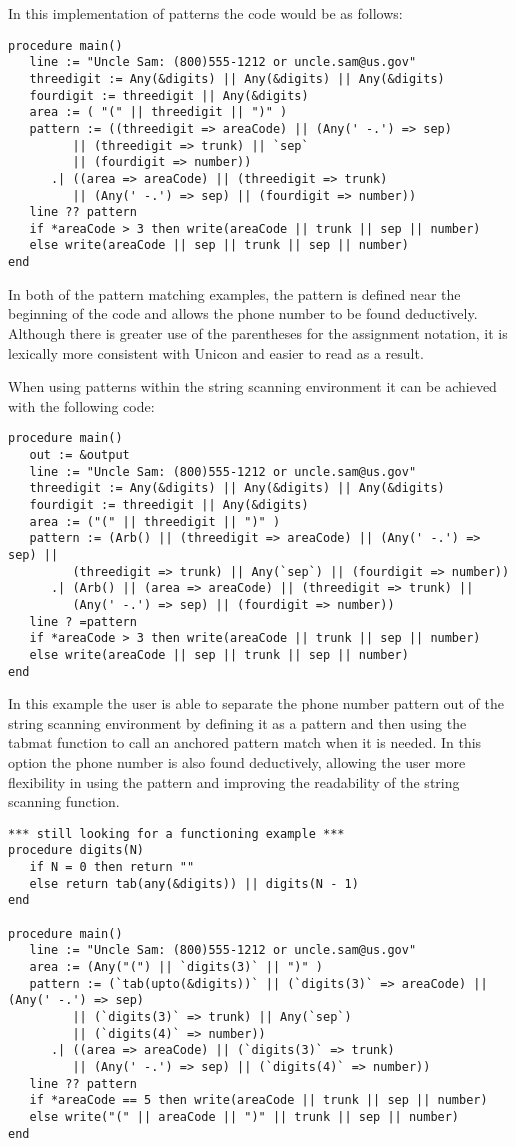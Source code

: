 \documentclass{article}
\begin{document}
In this implementation of patterns the code would be as follows:
\begin{verbatim}
procedure main()
   line := "Uncle Sam: (800)555-1212 or uncle.sam@us.gov"
   threedigit := Any(&digits) || Any(&digits) || Any(&digits)
   fourdigit := threedigit || Any(&digits)
   area := ( "(" || threedigit || ")" )
   pattern := ((threedigit => areaCode) || (Any(' -.') => sep) 
         || (threedigit => trunk) || `sep` 
         || (fourdigit => number))
      .| ((area => areaCode) || (threedigit => trunk) 
         || (Any(' -.') => sep) || (fourdigit => number))
   line ?? pattern
   if *areaCode > 3 then write(areaCode || trunk || sep || number) 
   else write(areaCode || sep || trunk || sep || number)
end
\end{verbatim}
In both of the pattern matching examples, the pattern is defined near the beginning of the code and allows the phone number to be found deductively. Although there is greater use of the parentheses for the assignment notation, it is lexically more consistent with Unicon and easier to read as a result.  

When using patterns within the string scanning environment it can be achieved with the following code:
\begin{verbatim}
procedure main()
   out := &output
   line := "Uncle Sam: (800)555-1212 or uncle.sam@us.gov"
   threedigit := Any(&digits) || Any(&digits) || Any(&digits)
   fourdigit := threedigit || Any(&digits)
   area := ("(" || threedigit || ")" )
   pattern := (Arb() || (threedigit => areaCode) || (Any(' -.') => sep) || 
         (threedigit => trunk) || Any(`sep`) || (fourdigit => number)) 
      .| (Arb() || (area => areaCode) || (threedigit => trunk) || 
         (Any(' -.') => sep) || (fourdigit => number))
   line ? =pattern 
   if *areaCode > 3 then write(areaCode || trunk || sep || number)
   else write(areaCode || sep || trunk || sep || number)
end
\end{verbatim}
In this example the user is able to separate the phone number pattern out of the string scanning environment by defining it as a pattern and then using the tabmat function to call an anchored pattern match when it is needed.  In this option the phone number is also found deductively, allowing the user more flexibility in using the pattern and improving the readability of the string scanning function.

\begin{verbatim}
*** still looking for a functioning example ***
procedure digits(N)
   if N = 0 then return ""
   else return tab(any(&digits)) || digits(N - 1)
end

procedure main()
   line := "Uncle Sam: (800)555-1212 or uncle.sam@us.gov"
   area := (Any("(") || `digits(3)` || ")" )
   pattern := (`tab(upto(&digits))` || (`digits(3)` => areaCode) || (Any(' -.') => sep) 
         || (`digits(3)` => trunk) || Any(`sep`) 
         || (`digits(4)` => number))
      .| ((area => areaCode) || (`digits(3)` => trunk) 
         || (Any(' -.') => sep) || (`digits(4)` => number))
   line ?? pattern
   if *areaCode == 5 then write(areaCode || trunk || sep || number)
   else write("(" || areaCode || ")" || trunk || sep || number) 
end
\end{verbatim}
\end{document}
